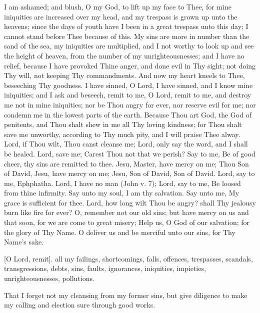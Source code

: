 
I am ashamed; and blush, O my God, to lift up my face to Thee, for mine iniquities are increased over my head, and my trespass is grown up unto the heavens; since the days of youth have I been in a great trespass unto this day; I cannot stand before Thee because of this. My sins are more in number than the sand of the sea, my iniquities are multiplied, and I not worthy to look up and see the height of heaven, from the number of my unrighteousnesses; and I have no relief, because I have provoked Thine anger, and done evil in Thy sight; not doing Thy will,  not keeping Thy commandments. And now my heart kneels to Thee, beseeching Thy goodness. I have sinned, O Lord, I have sinned, and I know mine iniquities; and I ask and beseech, remit to me, O Lord, remit to me, and destroy me not in mine iniquities;  nor be Thou angry for ever, nor reserve evil for me; nor condemn me in the lowest parts of the earth. Because Thou art God, the God of penitents, and Thou shalt shew in me all Thy loving kindness; for Thou shalt save me unworthy, according to Thy much pity, and I will praise Thee alway. Lord, if Thou wilt, Thou canst cleanse me; Lord, only say the word, and I shall be healed. Lord, save me; Carest Thou not that we perish? Say to me, Be of good cheer, thy sins are remitted to thee. Jesu, Master, have mercy on me; Thou Son of David, Jesu, have mercy on me; Jesu, Son of David, Son of David. Lord, say to me, Ephphatha. Lord, I have no man (John v. 7); Lord, say to me, Be loosed from thine infirmity. Say unto my soul, I am thy salvation. Say unto me, My grace is sufficient for thee. Lord, how long wilt Thou be angry? shall Thy jealousy burn like fire for ever? O, remember not our old sins; but have mercy on us and that soon, for we are come to great misery; Help us, O God of our salvation; for the glory of Thy Name. O deliver us and be merciful unto our sins, for Thy Name’s sake.


[O Lord, remit]. all my failings, shortcomings, falls, offences, trespasses, scandals, transgressions, debts, sins, faults, ignorances, iniquities, impieties, unrighteousnesses, pollutions.

That I forget not my cleansing from my former sins, but give diligence to make my calling and election sure through good works.


